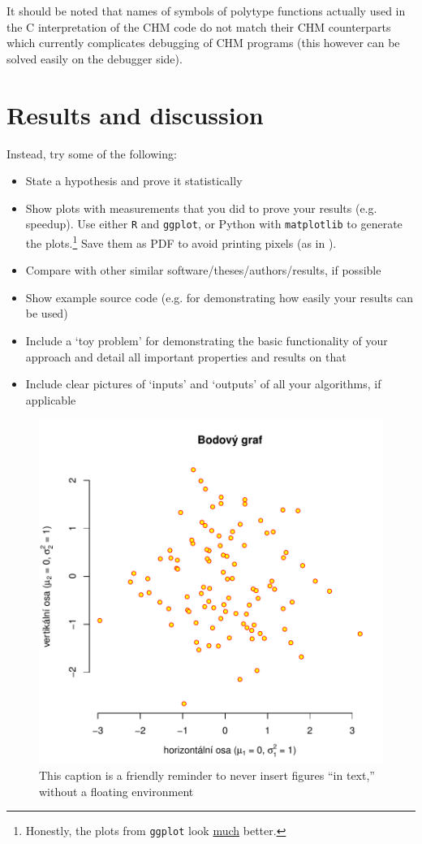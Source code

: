 It should be noted that names of symbols of polytype functions actually used in the C interpretation of the CHM code do not match
their CHM counterparts which currently complicates debugging of CHM programs (this however can be solved easily on the debugger side).

\chapter{Results and discussion}

\iffalse
Instead, try some of the following:
\begin{itemize}
\item State a hypothesis and prove it statistically
\item Show plots with measurements that you did to prove your results (e.g. speedup). Use either \texttt{R} and \texttt{ggplot}, or Python with \texttt{matplotlib} to generate the plots.\footnote{Honestly, the plots from \texttt{ggplot} look \underline{much} better.} Save them as PDF to avoid printing pixels (as in ).
\item Compare with other similar software/theses/authors/results, if possible
\item Show example source code (e.g. for demonstrating how easily your results can be used)
\item Include a `toy problem' for demonstrating the basic functionality of your approach and detail all important properties and results on that
\item Include clear pictures of `inputs' and `outputs' of all your algorithms, if applicable
\end{itemize}

\begin{figure}
\centering
\includegraphics[width=.6\linewidth]{img/ukazka-obr01.pdf}
\caption{This caption is a friendly reminder to never insert figures ``in text,'' without a floating environment}
\label{fig:f}
\end{figure}

